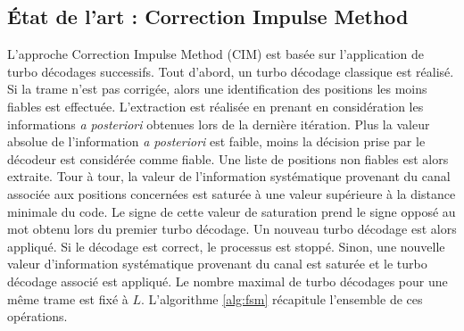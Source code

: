 \subsection{État de l'art : Correction Impulse Method}
L'approche Correction Impulse Method (CIM) est basée sur l'application de turbo décodages successifs. Tout d'abord, un turbo décodage 
classique est réalisé. Si la trame n'est pas corrigée, alors une identification des positions les moins fiables est effectuée. 
L'extraction est réalisée en prenant en considération les informations \textit{a posteriori} obtenues lors de la dernière 
itération. Plus la valeur absolue de l'information \textit{a posteriori} est faible, moins la décision prise par le 
décodeur est considérée comme fiable. Une liste de positions non fiables est alors extraite. Tour à tour, la valeur de l'information systématique provenant du canal 
associée aux positions concernées est saturée à une valeur supérieure à la distance minimale du code. Le signe de cette 
valeur de saturation prend le signe opposé au mot obtenu lors du premier turbo décodage. Un nouveau turbo décodage est alors
appliqué. Si le décodage est correct, le processus est stoppé. Sinon, une nouvelle valeur d'information systématique provenant du canal est saturée
et le turbo décodage associé est appliqué. Le nombre maximal de turbo décodages pour une même trame est fixé à 
$L$. L'algorithme \ref{alg:fsm} récapitule l'ensemble de ces opérations.

